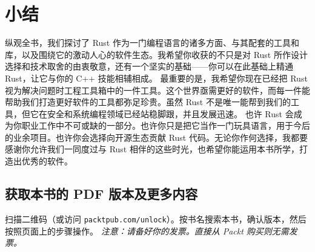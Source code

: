\section{小结}
纵观全书，我们探讨了 Rust 作为一门编程语言的诸多方面、与其配套的工具和库，以及围绕它的激动人心的软件生态。我希望你收获的不只是对 Rust 所作设计选择和技术取舍的由衷敬意，还有一个坚实的基础——你可以在此基础上精通 Rust，让它与你的 C++ 技能相辅相成。
最重要的是，我希望你现在已经把 Rust 视为解决问题时工程工具箱中的一件工具。这个世界亟需更好的软件，而每一件能帮助我们打造更好软件的工具都弥足珍贵。虽然 Rust 不是唯一能帮到我们的工具，但它在安全和系统编程领域已经站稳脚跟，并且发展迅速。
也许 Rust 会成为你职业工作中不可或缺的一部分。也许你只是把它当作一门玩具语言，用于今后的业余项目。也许你会选择向开源生态贡献 Rust 代码。无论你作何选择，我都要感谢你允许我们一同度过与 Rust 相伴的这些时光，也希望你能运用本书所学，打造出优秀的软件。
\begin{samepage}
\subsection{获取本书的 PDF 版本及更多内容}
扫描二维码（或访问 \texttt{packtpub.\allowbreak{}com/\allowbreak{}unlock}）。按书名搜索本书，确认版本，然后按照页面上的步骤操作。
\emph{注意：请备好你的发票。直接从 Packt 购买则无需发票。}
\end{samepage}
